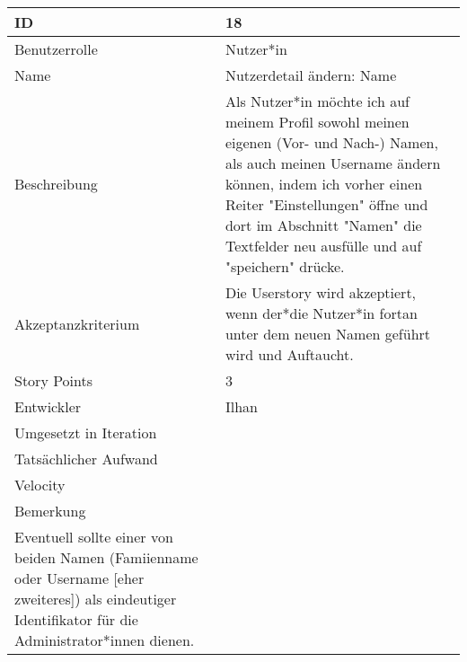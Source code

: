 \begin{tabularx}{\textwidth}{|p{}|X|}
	\hline
	ID & 18\\
	\hline
	Benutzerrolle & Nutzer*in\\
	\hline
	Name & Nutzerdetail ändern: Name\\
	\hline
	Beschreibung & Als Nutzer*in möchte ich auf meinem Profil sowohl meinen eigenen (Vor- und Nach-) Namen, als auch meinen Username ändern können, indem ich vorher einen Reiter "Einstellungen" öffne und dort im Abschnitt "Namen" die Textfelder neu ausfülle und auf "speichern" drücke.\\
	\hline
	Akzeptanzkriterium & Die Userstory wird akzeptiert, wenn der*die Nutzer*in fortan unter dem neuen Namen geführt wird und Auftaucht.\\
	\hline
	Story Points & 3\\
	\hline
	Entwickler & Ilhan\\
	\hline
	Umgesetzt in Iteration & \\ 
	\hline
	Tatsächlicher Aufwand & \\
	\hline
	Velocity & \\
	\hline
	Bemerkung & \\
Eventuell sollte einer von beiden Namen (Famiienname oder Username [eher zweiteres]) als eindeutiger Identifikator für die Administrator*innen dienen.
	\hline
\end{tabularx}
\vspace{20pt}
